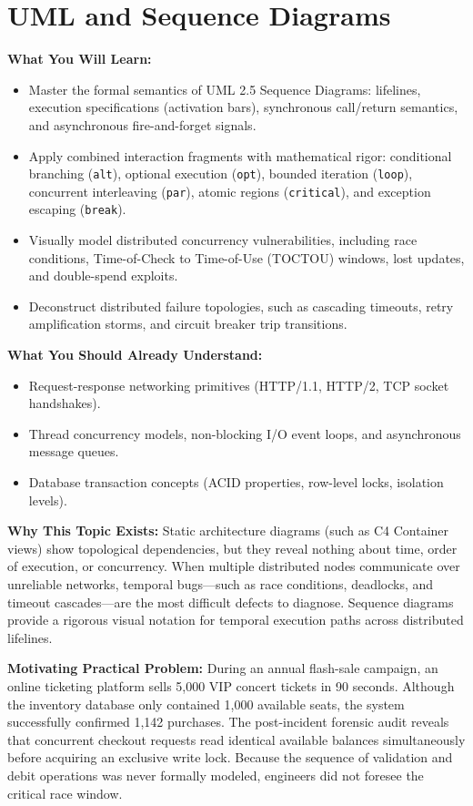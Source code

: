 \chapter{UML and Sequence Diagrams}
\label{ch:uml-sequence}

\begin{chaptergoalsbox}
\textbf{What You Will Learn:}
\begin{itemize}[leftmargin=12pt]
  \item Master the formal semantics of UML 2.5 Sequence Diagrams: lifelines, execution specifications (activation bars), synchronous call/return semantics, and asynchronous fire-and-forget signals.
  \item Apply combined interaction fragments with mathematical rigor: conditional branching (\texttt{alt}), optional execution (\texttt{opt}), bounded iteration (\texttt{loop}), concurrent interleaving (\texttt{par}), atomic regions (\texttt{critical}), and exception escaping (\texttt{break}).
  \item Visually model distributed concurrency vulnerabilities, including race conditions, Time-of-Check to Time-of-Use (TOCTOU) windows, lost updates, and double-spend exploits.
  \item Deconstruct distributed failure topologies, such as cascading timeouts, retry amplification storms, and circuit breaker trip transitions.
\end{itemize}

\textbf{What You Should Already Understand:}
\begin{itemize}[leftmargin=12pt]
  \item Request-response networking primitives (HTTP/1.1, HTTP/2, TCP socket handshakes).
  \item Thread concurrency models, non-blocking I/O event loops, and asynchronous message queues.
  \item Database transaction concepts (ACID properties, row-level locks, isolation levels).
\end{itemize}

\textbf{Why This Topic Exists:}
Static architecture diagrams (such as C4 Container views) show topological dependencies, but they reveal nothing about time, order of execution, or concurrency. When multiple distributed nodes communicate over unreliable networks, temporal bugs—such as race conditions, deadlocks, and timeout cascades—are the most difficult defects to diagnose. Sequence diagrams provide a rigorous visual notation for temporal execution paths across distributed lifelines.

\textbf{Motivating Practical Problem:}
During an annual flash-sale campaign, an online ticketing platform sells 5,000 VIP concert tickets in 90 seconds. Although the inventory database only contained 1,000 available seats, the system successfully confirmed 1,142 purchases. The post-incident forensic audit reveals that concurrent checkout requests read identical available balances simultaneously before acquiring an exclusive write lock. Because the sequence of validation and debit operations was never formally modeled, engineers did not foresee the critical race window.
\end{chaptergoalsbox}

